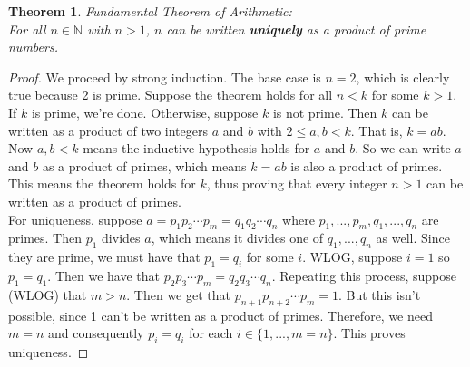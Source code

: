 \documentclass[12pt, a4paper, titlepage, twoside]{article}
\newcommand*{\N}{\mathbb{N}}
\newtheorem*{theorem*}{Theorem}
\begin{document}
	\begin{pf}
		\label{apA:fta}
		\begin{theorem*}
			Fundamental Theorem of Arithmetic:\\
			For all $n \in \N$ with $n > 1$, $n$ can be written \textbf{uniquely} as a product of prime numbers.
		\end{theorem*}

		\tcbline		
		
		\begin{proof}
			We proceed by strong induction. The base case is $n=2$, which is clearly true because 2 is prime.
			Suppose the theorem holds for all $n < k$ for some $k > 1$. If $k$ is prime, we're done. Otherwise, suppose $k$ is not
			prime. Then $k$ can be written as a product of two integers $a$ and $b$ with $2 \leqslant a, b < k$.
			That is, $k = ab$. Now $a,b < k$ means the inductive hypothesis holds for $a$ and $b$. So we can write
			$a$ and $b$ as a product of primes, which means $k = ab$ is also a product of primes. This means the theorem
			holds for $k$, thus proving that every integer $n > 1$ can be written as a product of primes.\\
			
			For uniqueness, suppose $a = p_1 p_2 \cdots p_m = q_1 q_2 \cdots q_n$ where $p_1, ..., p_m, q_1, ..., q_n$
			are primes. Then $p_1$ divides $a$, which means it divides one of $q_1, ..., q_n$ as well. Since they are prime, we must
			have that $p_1 = q_i$ for some $i$. WLOG, suppose $i = 1$ so $p_1 = q_1$. Then we have that
			$p_2 p_3 \cdots p_m = q_2 q_3 \cdots q_n$. Repeating this process, suppose (WLOG) that $m > n$. Then we get that
			$p_{n+1} p_{n+2} \cdots p_m = 1$. But this isn't possible, since 1 can't be written as a product of primes. Therefore, we
			need $m=n$ and consequently $p_i = q_i$ for each $i \in \{1, ..., m=n\}$. This proves uniqueness.
		\end{proof}
	\end{pf}
	
	\hfill
	
\end{document}
